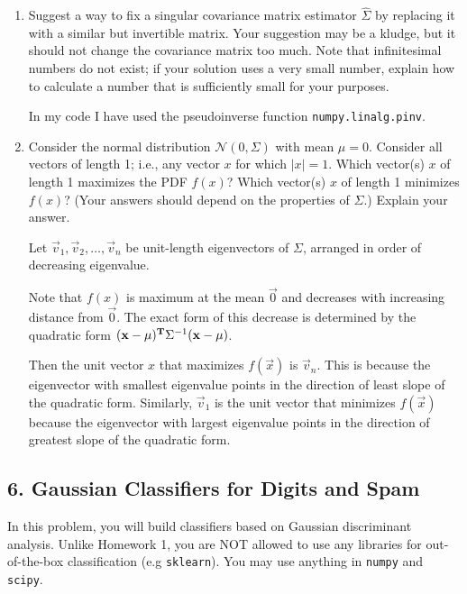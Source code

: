 \documentclass{article}
\renewcommand{\N}{\mathcal{N}}
\renewcommand{\hat}{\widehat}
\begin{document}
\begin{enumerate}[label=(\alph*)]
\begin{mdframed}
    \end{mdframed}

  \item Suggest a way to fix a singular covariance matrix estimator
    $\hat{\Sigma}$ by replacing it with a similar but invertible matrix. Your
    suggestion may be a kludge, but it should not change the covariance matrix
    too much. Note that infinitesimal numbers do not exist; if your solution
    uses a very small number, explain how to calculate a number that is
    sufficiently small for your purposes.
    \begin{mdframed}
      In my code I have used the pseudoinverse function
      \texttt{numpy.linalg.pinv}.
    \end{mdframed}

  \item Consider the normal distribution $\N(0, \Sigma)$ with mean $\mu =
    0$. Consider all vectors of length 1; i.e., any vector $x$ for which
    $|x| =1$. Which vector(s) $x$ of length 1 maximizes the PDF $f(x)$? Which
    vector(s) $x$ of length 1 minimizes $f(x)$? (Your answers should depend on
    the properties of $\Sigma$.) Explain your answer.
    \begin{mdframed}
      Let $\vec v_1, \vec v_2, \ldots, \vec v_n$ be unit-length eigenvectors of
      $\Sigma$, arranged in order of decreasing eigenvalue.

      Note that $f(x)$ is maximum at the mean $\vec 0$ and decreases with
      increasing distance from $\vec 0$. The exact form of this decrease is
      determined by the quadratic form
      $(\mathbf x - \mu)^{\mathbf{T}}\Sigma^{-1} (\mathbf x - \mu)$.

      Then the unit vector $x$ that maximizes $f(\vec x)$ is $\vec v_n$. This
      is because the eigenvector with smallest eigenvalue points in the
      direction of least slope of the quadratic form. Similarly, $\vec v_1$ is
      the unit vector that minimizes $f(\vec x)$ because the eigenvector with
      largest eigenvalue points in the direction of greatest slope of the
      quadratic form.
    \end{mdframed}
\end{enumerate}

\newpage
\subsection*{6. Gaussian Classifiers for Digits and Spam}
In this problem, you will build classifiers based on Gaussian discriminant analysis. Unlike Homework 1, you are NOT allowed to use any libraries for out-of-the-box classification (e.g \texttt{sklearn}). You may use anything in \texttt{numpy} and \texttt{scipy}. \\
\end{document}
